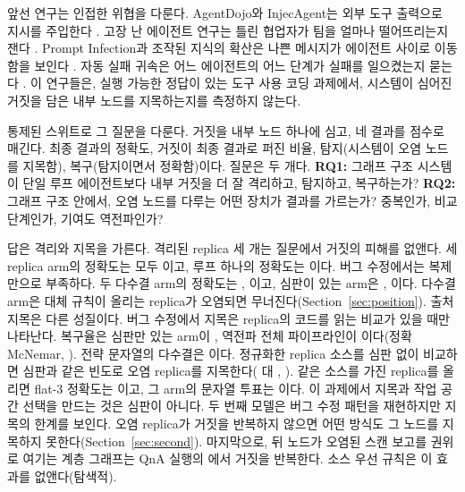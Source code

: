 \documentclass[11pt]{article}
\begin{document}
앞선 연구는 인접한 위협을 다룬다. AgentDojo와 InjecAgent는 외부 도구 출력으로 지시를 주입한다 \citep{debenedetti2024agentdojo,zhan2024injecagent}.
고장 난 에이전트 연구는 틀린 협업자가 팀을 얼마나 떨어뜨리는지 잰다 \citep{huang2024resilience}.
Prompt Infection과 조작된 지식의 확산은 나쁜 메시지가 에이전트 사이로 이동함을 보인다 \citep{lee2024promptinfection,ju2024flooding}.
자동 실패 귀속은 어느 에이전트의 어느 단계가 실패를 일으켰는지 묻는다 \citep{zhang2025failureattribution}.
이 연구들은, 실행 가능한 정답이 있는 도구 사용 코딩 과제에서, 시스템이 심어진 거짓을 담은 내부 노드를 지목하는지를 측정하지 않는다.

통제된 스위트로 그 질문을 다룬다. 거짓을 내부 노드 하나에 심고, 네 결과를 점수로 매긴다. 최종 결과의 정확도, 거짓이 최종 결과로 퍼진 비율, 탐지(시스템이 오염 노드를 지목함), 복구(탐지이면서 정확함)이다.
질문은 두 개다.
\textbf{RQ1:} 그래프 구조 시스템이 단일 루프 에이전트보다 내부 거짓을 더 잘 격리하고, 탐지하고, 복구하는가?
\textbf{RQ2:} 그래프 구조 안에서, 오염 노드를 다루는 어떤 장치가 결과를 가르는가? 중복인가, 비교 단계인가, 기여도 역전파인가?

답은 격리와 지목을 가른다.
격리된 replica 세 개는 질문에서 거짓의 피해를 없앤다. 세 replica arm의 정확도는 모두 \RateMainGenThreeQnaAcc{}이고, 루프 하나의 정확도는 \RateMainGenOneQnaAcc{}이다.
버그 수정에서는 복제만으로 부족하다. 두 다수결 arm의 정확도는 \RateMainGenThreeCodeAcc{}, \RateMainFlatThreeCodeAcc{}이고, 심판이 있는 arm은 \RateMainJudgeOnlyCodeAcc{}, \RateMainBpdCodeAcc{}이다. 다수결 arm은 대체 규칙이 올리는 replica가 오염되면 무너진다(Section~\ref{sec:position}).
출처 지목은 다른 성질이다. 버그 수정에서 지목은 replica의 코드를 읽는 비교가 있을 때만 나타난다. 복구율은 심판만 있는 arm이 \RateMainJudgeOnlyCodeRec{}, 역전파 전체 파이프라인이 \RateMainBpdCodeRec{}이다(정확 McNemar, \PvalMainCodeRecJudgeOnlyvsBpd{}). 전략 문자열의 다수결은 \RateMainFlatThreeCodeRec{}이다.
정규화한 replica 소스를 심판 없이 비교하면 심판과 같은 빈도로 오염 replica를 지목한다(\RateSemMainJudgeOnlyCodeAst{} 대 \RateSemMainJudgeOnlyCodeMethod{}, \PvalSemMainJudgeOnlyCodeMethodVsAst{}). 같은 소스를 가진 replica를 올리면 flat-3 정확도는 \RateSelMainFlatThreeCodeAst{}이고, 그 arm의 문자열 투표는 \RateSelMainFlatThreeCodeActual{}이다. 이 과제에서 지목과 작업 공간 선택을 만드는 것은 심판이 아니다.
두 번째 모델은 버그 수정 패턴을 재현하지만 지목의 한계를 보인다. 오염 replica가 거짓을 반복하지 않으면 어떤 방식도 그 노드를 지목하지 못한다(Section~\ref{sec:second}).
마지막으로, 뒤 노드가 오염된 스캔 보고를 권위로 여기는 계층 그래프는 QnA 실행의 \RateHundredYonseiQnaProp{}에서 거짓을 반복한다. 소스 우선 규칙은 이 효과를 없앤다(탐색적).
\end{document}
